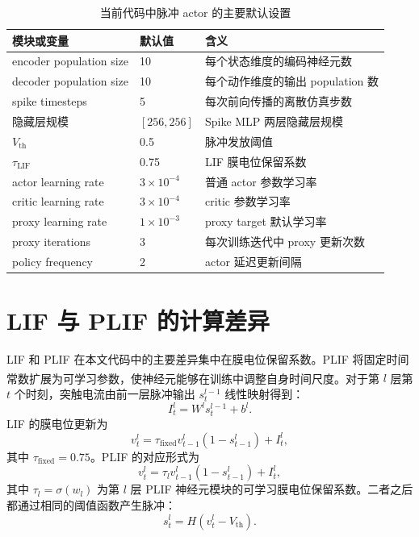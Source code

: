 \documentclass[UTF8,zihao=-4,oneside,openany]{ctexbook}
\let\oldcite\cite
\renewcommand{\cite}[1]{\textsuperscript{\oldcite{#1}}}
\begin{document}
\begin{table}[htbp]
\centering
\caption{当前代码中脉冲 actor 的主要默认设置}
\begin{tabular}{lll}
\toprule
\textbf{模块或变量} & \textbf{默认值} & \textbf{含义} \\
\midrule
encoder population size & 10 & 每个状态维度的编码神经元数 \\
decoder population size & 10 & 每个动作维度的输出 population 数 \\
spike timesteps & 5 & 每次前向传播的离散仿真步数 \\
隐藏层规模 & $[256,256]$ & Spike MLP 两层隐藏层规模 \\
$V_{\mathrm{th}}$ & 0.5 & 脉冲发放阈值 \\
$\tau_{\mathrm{LIF}}$ & 0.75 & LIF 膜电位保留系数 \\
actor learning rate & $3\times10^{-4}$ & 普通 actor 参数学习率 \\
critic learning rate & $3\times10^{-4}$ & critic 参数学习率 \\
proxy learning rate & $1\times10^{-3}$ & proxy target 默认学习率 \\
proxy iterations & 3 & 每次训练迭代中 proxy 更新次数 \\
policy frequency & 2 & actor 延迟更新间隔 \\
\bottomrule
\end{tabular}
\end{table}

\section{LIF 与 PLIF 的计算差异}
LIF 和 PLIF 在本文代码中的主要差异集中在膜电位保留系数。PLIF 将固定时间常数扩展为可学习参数，使神经元能够在训练中调整自身时间尺度\cite{fang2021plif}。对于第 $l$ 层第 $t$ 个时刻，突触电流由前一层脉冲输出 $s_{t}^{l-1}$ 线性映射得到：
\begin{equation}
I_t^l=W^l s_t^{l-1}+b^l.
\end{equation}
LIF 的膜电位更新为
\begin{equation}
v_t^l=\tau_{\mathrm{fixed}}v_{t-1}^l(1-s_{t-1}^l)+I_t^l,
\end{equation}
其中 $\tau_{\mathrm{fixed}}=0.75$。PLIF 的对应形式为
\begin{equation}
v_t^l=\tau_l v_{t-1}^l(1-s_{t-1}^l)+I_t^l,
\end{equation}
其中 $\tau_l=\sigma(w_l)$ 为第 $l$ 层 PLIF 神经元模块的可学习膜电位保留系数。二者之后都通过相同的阈值函数产生脉冲：
\begin{equation}
s_t^l=H(v_t^l-V_{\mathrm{th}}).
\end{equation}
\end{document}
